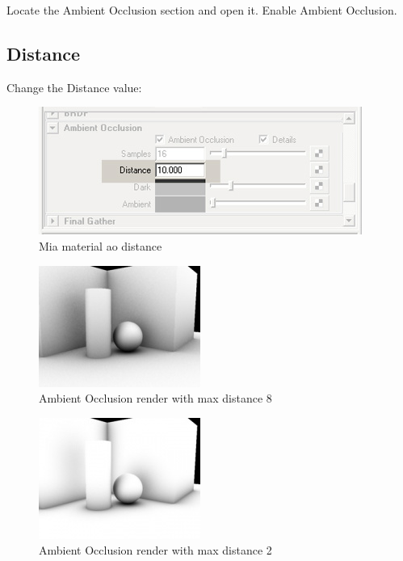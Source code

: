\documentclass[10pt,a4paper]{article}
\begin{document}
Locate the Ambient Occlusion section and open it. Enable Ambient Occlusion.

\subsection{Distance}
Change the Distance value:

\begin{figure}[tbh]
\centering
\includegraphics[width=0.5\linewidth]{figure/Mia_material_ao_distance}
\caption{Mia material ao distance}
\label{fig:miamaterialaodistance}
\end{figure}

\begin{figure}[tbh]
\centering
\includegraphics[width=0.5\linewidth]{figure/Amb_occlusion_example_distance8}
\caption{Ambient Occlusion render with max distance 8}
\label{fig:ambocclusionexampledistance8}
\end{figure}

\begin{figure}[tbh]
\centering
\includegraphics[width=0.5\linewidth]{figure/Amb_occlusion_example_distance2}
\caption{Ambient Occlusion render with max distance 2}
\label{fig:ambocclusionexampledistance2}
\end{figure}
\end{document}
